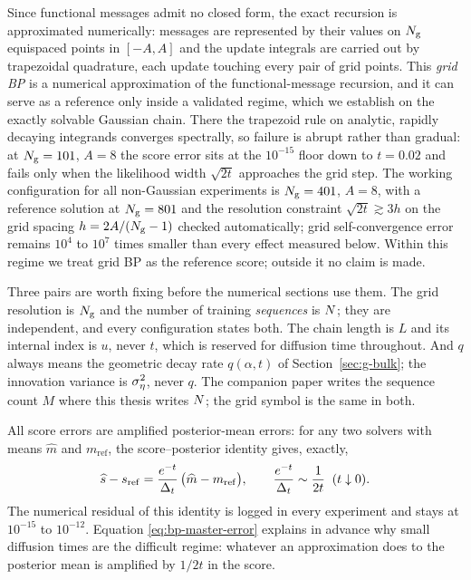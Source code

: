 Since functional messages admit no closed form, the exact recursion is
approximated numerically: messages are represented by their values on $N_{\mathrm{g}}$
equispaced points in $[-A, A]$ and the update integrals are carried out
by trapezoidal quadrature, each update touching every pair of grid
points. This
\emph{grid BP} is a numerical approximation of the functional-message
recursion, and it can serve as a reference only inside a validated
regime, which we establish on the exactly solvable Gaussian chain. There
the trapezoid rule on analytic, rapidly decaying integrands converges
spectrally, so failure is abrupt rather than gradual: at $N_{\mathrm{g}} = 101$,
$A = 8$ the score error sits at the $10^{-15}$ floor down to $t = 0.02$
and fails only when the likelihood width $\sqrt{2t}$ approaches the grid
step. The working configuration for all non-Gaussian experiments is
$N_{\mathrm{g}} = 401$, $A = 8$, with a reference solution at $N_{\mathrm{g}} = 801$ and the
resolution constraint $\sqrt{2t} \gtrsim 3h$ on the grid spacing
$h = 2A/(N_{\mathrm{g}}-1)$ checked automatically;
grid self-convergence error remains $10^4$ to $10^7$ times smaller than
every effect measured below. Within this regime we treat grid BP as the
reference score; outside it no claim is made.

\begin{remark}
Three pairs are worth fixing before the numerical sections use them. The grid
resolution is $N_{\mathrm{g}}$ and the number of training \emph{sequences} is $N$;
they are independent, and every configuration states both. The chain length is
$L$ and its internal index is $u$, never $t$, which is reserved for diffusion
time throughout. And $q$ always means the geometric decay rate $q(\alpha,t)$
of Section~\ref{sec:g-bulk}; the innovation variance is $\sigma_\eta^2$, never $q$.
The companion paper writes the sequence count $M$ where this thesis writes
$N$; the grid symbol is the same in both.
\end{remark}

All score errors are amplified posterior-mean errors: for any two solvers
with means $\widehat m$ and $m_{\mathrm{ref}}$, the score--posterior
identity gives, exactly,
\begin{equation}
  \widehat s - s_{\mathrm{ref}}
  = \frac{e^{-t}}{\Delta_t}\,
    \big( \widehat m - m_{\mathrm{ref}} \big),
  \qquad
  \frac{e^{-t}}{\Delta_t} \sim \frac{1}{2t} \;\; (t \downarrow 0).
  \label{eq:bp-master-error}
\end{equation}
The numerical residual of this identity is logged in every experiment and
stays at $10^{-15}$ to $10^{-12}$. Equation \eqref{eq:bp-master-error}
explains in advance why small diffusion times are the difficult regime:
whatever an approximation does to the posterior mean is amplified by
$1/2t$ in the score.

